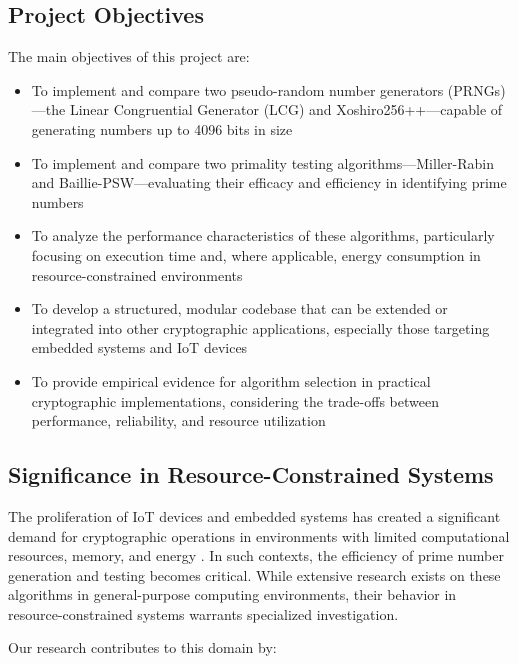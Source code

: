 \subsection{Project Objectives}

The main objectives of this project are:

\begin{itemize}
    \item To implement and compare two pseudo-random number generators (PRNGs)—the Linear Congruential Generator (LCG) and Xoshiro256++—capable of generating numbers up to 4096 bits in size
    
    \item To implement and compare two primality testing algorithms—Miller-Rabin and Baillie-PSW—evaluating their efficacy and efficiency in identifying prime numbers
    
    \item To analyze the performance characteristics of these algorithms, particularly focusing on execution time and, where applicable, energy consumption in resource-constrained environments
    
    \item To develop a structured, modular codebase that can be extended or integrated into other cryptographic applications, especially those targeting embedded systems and IoT devices
    
    \item To provide empirical evidence for algorithm selection in practical cryptographic implementations, considering the trade-offs between performance, reliability, and resource utilization
\end{itemize}

\subsection{Significance in Resource-Constrained Systems}

The proliferation of IoT devices and embedded systems has created a significant demand for cryptographic operations in environments with limited computational resources, memory, and energy \cite{embedded_prng}. In such contexts, the efficiency of prime number generation and testing becomes critical. While extensive research exists on these algorithms in general-purpose computing environments, their behavior in resource-constrained systems warrants specialized investigation.

Our research contributes to this domain by:

